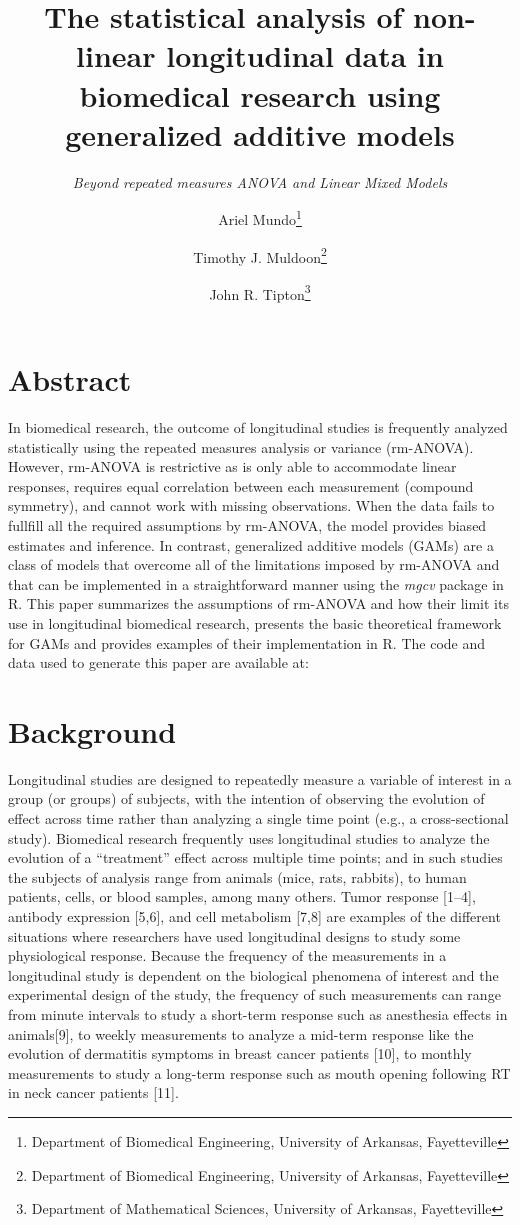 \documentclass[
]{article}
\title{\textbf{The statistical analysis of non-linear longitudinal data in biomedical research using generalized additive models}}
\subtitle{\emph{Beyond repeated measures ANOVA and Linear Mixed Models}}
\author{Ariel Mundo\footnote{Department of Biomedical Engineering, University of Arkansas, Fayetteville} \and Timothy J. Muldoon\footnote{Department of Biomedical Engineering, University of Arkansas, Fayetteville} \and John R. Tipton\footnote{Department of Mathematical Sciences, University of Arkansas, Fayetteville}}
\date{}
\begin{document}
\maketitle

{
\setcounter{tocdepth}{2}
\tableofcontents
}
\hypertarget{abstract}{%
\section{Abstract}\label{abstract}}

In biomedical research, the outcome of longitudinal studies is frequently analyzed statistically using the repeated measures analysis or variance (rm-ANOVA). However, rm-ANOVA is restrictive as is only able to accommodate linear responses, requires equal correlation between each measurement (compound symmetry), and cannot work with missing observations. When the data fails to fullfill all the required assumptions by rm-ANOVA, the model provides biased estimates and inference. In contrast, generalized additive models (GAMs) are a class of models that overcome all of the limitations imposed by rm-ANOVA and that can be implemented in a straightforward manner using the \emph{mgcv} package in R. This paper summarizes the assumptions of rm-ANOVA and how their limit its use in longitudinal biomedical research, presents the basic theoretical framework for GAMs and provides examples of their implementation in R. The code and data used to generate this paper are available at:

\hypertarget{background}{%
\section{Background}\label{background}}

Longitudinal studies are designed to repeatedly measure a variable of interest in a group (or groups) of subjects, with the intention of observing the evolution of effect across time rather than analyzing a single time point (e.g., a cross-sectional study). Biomedical research frequently uses longitudinal studies to analyze the evolution of a ``treatment'' effect across multiple time points; and in such studies the subjects of analysis range from animals (mice, rats, rabbits), to human patients, cells, or blood samples, among many others. Tumor response {[}1--4{]}, antibody expression {[}5,6{]}, and cell metabolism {[}7,8{]} are examples of the different situations where researchers have used longitudinal designs to study some physiological response. Because the frequency of the measurements in a longitudinal study is dependent on the biological phenomena of interest and the experimental design of the study, the frequency of such measurements can range from minute intervals to study a short-term response such as anesthesia effects in animals{[}9{]}, to weekly measurements to analyze a mid-term response like the evolution of dermatitis symptoms in breast cancer patients {[}10{]}, to monthly measurements to study a long-term response such as mouth opening following RT in neck cancer patients {[}11{]}.
\end{document}
